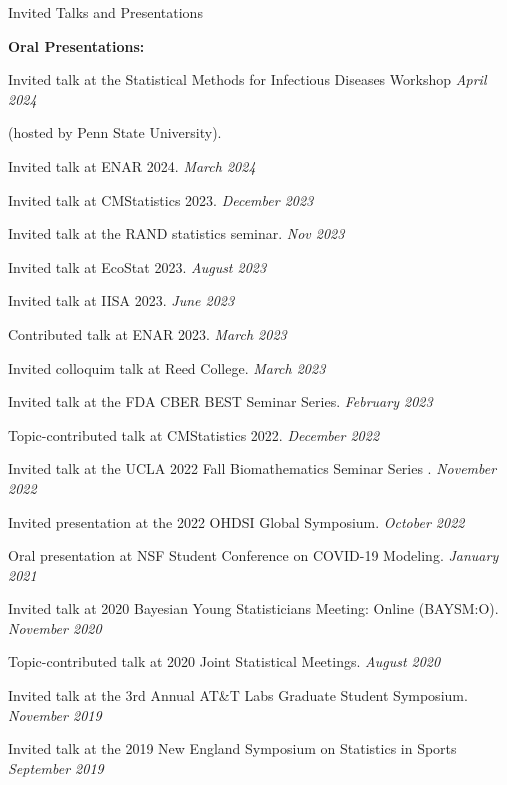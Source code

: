 \documentclass{resume} %
\begin{document}
\begin{rSection}{Invited Talks and Presentations}

\hspace{-.2in} {\textbf{Oral Presentations:}}


Invited talk at the Statistical Methods for Infectious Diseases Workshop \hfill {\em April 2024}

\vspace{-0.1in}(hosted by Penn State University).

Invited talk at ENAR 2024.  \hfill {\em March 2024}

Invited talk at CMStatistics 2023. \hfill {\em December 2023}

Invited talk at the RAND statistics seminar. \hfill {\em Nov 2023}

Invited talk at EcoStat 2023. \hfill {\em August 2023}

Invited talk at IISA 2023.  \hfill {\em June 2023}

%

Contributed talk at ENAR 2023. \hfill {\em March 2023}

Invited colloquim talk at Reed College. \hfill {\em March 2023}

Invited talk at the FDA CBER BEST Seminar Series. \hfill {\em February 2023}

Topic-contributed talk at CMStatistics 2022. \hfill {\em December 2022}

Invited talk at the UCLA 2022 Fall Biomathematics Seminar Series . \hfill {\em November 2022}

Invited presentation at the 2022 OHDSI Global Symposium.  \hfill {\em October 2022}

{Oral presentation at NSF Student Conference on COVID-19 Modeling.} \hfill {\em January 2021}

{Invited talk at 2020 Bayesian Young Statisticians Meeting: Online (BAYSM:O).} \hfill {\em November 2020}

{Topic-contributed talk at 2020 Joint Statistical Meetings. } \hfill {\em August 2020}

{Invited talk at the 3rd Annual AT\&T Labs Graduate Student Symposium.} \hfill {\em November 2019}


{Invited talk at the 2019 New England Symposium on Statistics in Sports} \hfill {\em September 2019}


\end{rSection}
\end{document}
